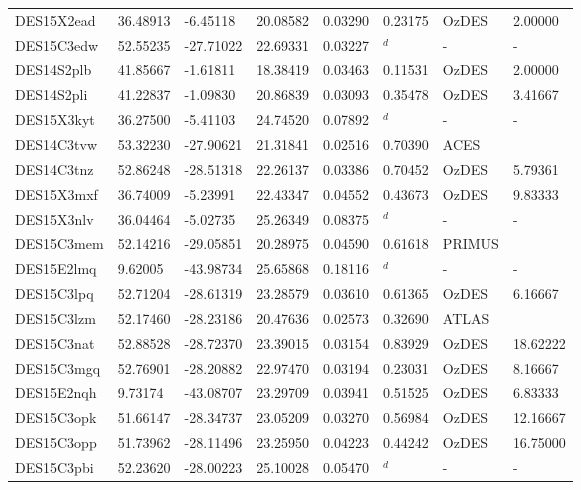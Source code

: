 \documentclass[fleqn,usenatbib,]{mnras}
\begin{document}
\begin{table}
\begin{threeparttable}
\begin{tabular}{llllllll}
DES15X2ead     & 36.48913 &  -6.45118 & 20.08582 & 0.03290 & 0.23175 &      OzDES &       2.00000 \\
DES15C3edw     & 52.55235 & -27.71022 & 22.69331 & 0.03227 &    $^d$ &          - &             - \\
DES14S2plb     & 41.85667 &  -1.61811 & 18.38419 & 0.03463 & 0.11531 &      OzDES &       2.00000 \\
DES14S2pli     & 41.22837 &  -1.09830 & 20.86839 & 0.03093 & 0.35478 &      OzDES &       3.41667 \\
DES15X3kyt     & 36.27500 &  -5.41103 & 24.74520 & 0.07892 &    $^d$ &          - &             - \\
DES14C3tvw     & 53.32230 & -27.90621 & 21.31841 & 0.02516 & 0.70390 &       ACES &               \\
DES14C3tnz     & 52.86248 & -28.51318 & 22.26137 & 0.03386 & 0.70452 &      OzDES &       5.79361 \\
DES15X3mxf     & 36.74009 &  -5.23991 & 22.43347 & 0.04552 & 0.43673 &      OzDES &       9.83333 \\
DES15X3nlv     & 36.04464 &  -5.02735 & 25.26349 & 0.08375 &    $^d$ &          - &             - \\
DES15C3mem     & 52.14216 & -29.05851 & 20.28975 & 0.04590 & 0.61618 &     PRIMUS &               \\
DES15E2lmq     &  9.62005 & -43.98734 & 25.65868 & 0.18116 &    $^d$ &          - &             - \\
DES15C3lpq     & 52.71204 & -28.61319 & 23.28579 & 0.03610 & 0.61365 &      OzDES &       6.16667 \\
DES15C3lzm     & 52.17460 & -28.23186 & 20.47636 & 0.02573 & 0.32690 &      ATLAS &               \\
DES15C3nat     & 52.88528 & -28.72370 & 23.39015 & 0.03154 & 0.83929 &      OzDES &      18.62222 \\
DES15C3mgq     & 52.76901 & -28.20882 & 22.97470 & 0.03194 & 0.23031 &      OzDES &       8.16667 \\
DES15E2nqh     &  9.73174 & -43.08707 & 23.29709 & 0.03941 & 0.51525 &      OzDES &       6.83333 \\
DES15C3opk     & 51.66147 & -28.34737 & 23.05209 & 0.03270 & 0.56984 &      OzDES &      12.16667 \\
DES15C3opp     & 51.73962 & -28.11496 & 23.25950 & 0.04223 & 0.44242 &      OzDES &      16.75000 \\
DES15C3pbi     & 52.23620 & -28.00223 & 25.10028 & 0.05470 &    $^d$ &          - &             - \\

\end{tabular}
\end{threeparttable}
\end{table}
\end{document}
